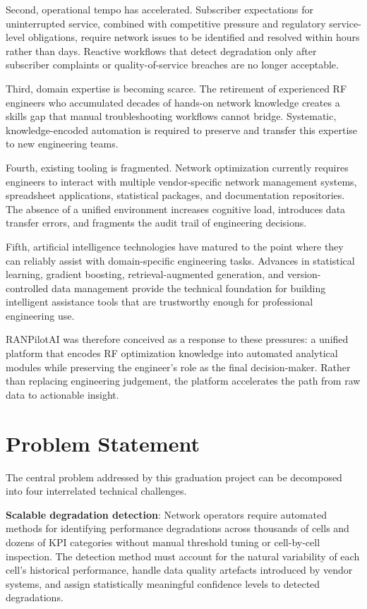 Second, operational tempo has accelerated. Subscriber expectations for uninterrupted service, combined with competitive pressure and regulatory service-level obligations, require network issues to be identified and resolved within hours rather than days. Reactive workflows that detect degradation only after subscriber complaints or quality-of-service breaches are no longer acceptable.

Third, domain expertise is becoming scarce. The retirement of experienced RF engineers who accumulated decades of hands-on network knowledge creates a skills gap that manual troubleshooting workflows cannot bridge. Systematic, knowledge-encoded automation is required to preserve and transfer this expertise to new engineering teams.

Fourth, existing tooling is fragmented. Network optimization currently requires engineers to interact with multiple vendor-specific network management systems, spreadsheet applications, statistical packages, and documentation repositories. The absence of a unified environment increases cognitive load, introduces data transfer errors, and fragments the audit trail of engineering decisions.

Fifth, artificial intelligence technologies have matured to the point where they can reliably assist with domain-specific engineering tasks. Advances in statistical learning, gradient boosting, retrieval-augmented generation, and version-controlled data management provide the technical foundation for building intelligent assistance tools that are trustworthy enough for professional engineering use.

RANPilotAI was therefore conceived as a response to these pressures: a unified platform that encodes RF optimization knowledge into automated analytical modules while preserving the engineer's role as the final decision-maker. Rather than replacing engineering judgement, the platform accelerates the path from raw data to actionable insight.

\section{Problem Statement}

The central problem addressed by this graduation project can be decomposed into four interrelated technical challenges.

\textbf{Scalable degradation detection}: Network operators require automated methods for identifying performance degradations across thousands of cells and dozens of KPI categories without manual threshold tuning or cell-by-cell inspection. The detection method must account for the natural variability of each cell's historical performance, handle data quality artefacts introduced by vendor systems, and assign statistically meaningful confidence levels to detected degradations.

